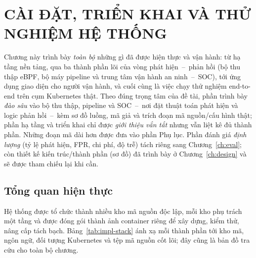 
\chapter{CÀI ĐẶT, TRIỂN KHAI VÀ THỬ NGHIỆM HỆ THỐNG}
\label{ch:impl}

Chương này trình bày \emph{toàn bộ} những gì đã được hiện thực và vận hành: từ hạ
tầng nền tảng, qua ba thành phần lõi của vòng phát hiện~--~phản hồi (bộ thu thập
eBPF, bộ máy pipeline và trung tâm vận hành an ninh~--~SOC), tới ứng dụng giao diện
cho người vận hành, và cuối cùng là việc chạy thử nghiệm end-to-end trên cụm
Kubernetes thật. Theo đúng trọng tâm của đề tài, phần trình bày \emph{đào sâu} vào
bộ thu thập, pipeline và SOC~--~nơi đặt thuật toán phát hiện và logic phản hồi~--~kèm
sơ đồ luồng, mã giả và trích đoạn mã nguồn/cấu hình thật; phần hạ tầng và triển khai
chỉ được \emph{giới thiệu vắn tắt} nhưng vẫn liệt kê đủ thành phần. Những đoạn mã dài
hơn được đưa vào phần Phụ lục. Phần đánh giá
\emph{định lượng} (tỷ lệ phát hiện, FPR, chi phí, độ trễ) tách riêng sang
Chương~\ref{ch:eval}; còn thiết kế kiến trúc/thành phần (sơ đồ) đã trình bày ở
Chương~\ref{ch:design} và sẽ được tham chiếu lại khi cần.

\section{Tổng quan hiện thực}
\label{sec:impl-overview}

Hệ thống được tổ chức thành nhiều kho mã nguồn độc lập, mỗi kho phụ trách một tầng và
được đóng gói thành ảnh container riêng để xây dựng, kiểm thử, nâng cấp tách bạch.
Bảng~\ref{tab:impl-stack} ánh xạ mỗi thành phần tới kho mã, ngôn ngữ, đối tượng
Kubernetes và tệp mã nguồn cốt lõi; đây cũng là bản đồ tra cứu cho toàn bộ chương.

